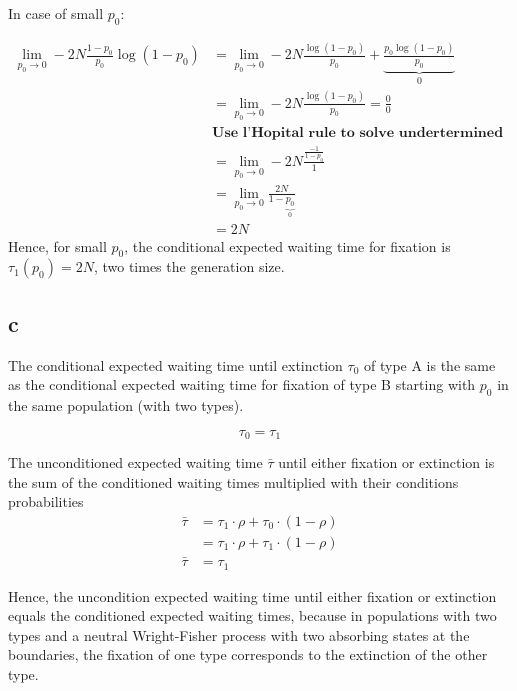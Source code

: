 In case of small $p_0$:

\begin{align*}
\lim\limits_{p_0 \rightarrow 0} -2N \frac{1-p_0}{p_0} \log(1-p_0) &= \lim\limits_{p_0 \rightarrow 0} -2N \frac{\log(1-p_0)}{p_0}+\underbrace{\frac{p_0\log(1-p_0)}{p_0}}_\text{$0$}\\
&= \lim\limits_{p_0 \rightarrow 0} -2N\frac{\log(1-p_0)}{p_0} = \frac{0}{0} \\
& \textbf{Use l'Hopital rule to solve undertermined forms}\\
&= \lim\limits_{p_0 \rightarrow 0} -2N\frac{\frac{-1}{1-p_0}}{1} \\
&= \lim\limits_{p_0 \rightarrow 0} \frac{2N}{1-\underbrace{p_0}_\text{$0$}}\\
&= 2N
\end{align*}
Hence, for small $p_0$, the conditional expected waiting time for fixation is $\tau_1(p_0) = 2N$, two times the generation size.

\subsection{c}

The conditional expected waiting time until extinction $\tau_0$ of type A is the same as the conditional expected waiting time for fixation of type B starting with $p_0$ in the same population (with two types).

\[\tau_0  = \tau_1\]

The unconditioned expected waiting time $\bar{\tau}$ until either fixation or extinction is the sum of the conditioned waiting times multiplied with their conditions probabilities
\begin{align*}
\bar{\tau} &= \tau_1 \cdot \rho + \tau_0 \cdot (1-\rho)\\
&= \tau_1 \cdot \rho + \tau_1 \cdot (1-\rho)\\
\bar{\tau} &= \tau_1
\end{align*}

Hence, the uncondition expected waiting time until either fixation or extinction equals the conditioned expected waiting times, because in populations with two types and a neutral Wright-Fisher process with two absorbing states at the boundaries, the fixation of one type corresponds to the extinction of the other type.
